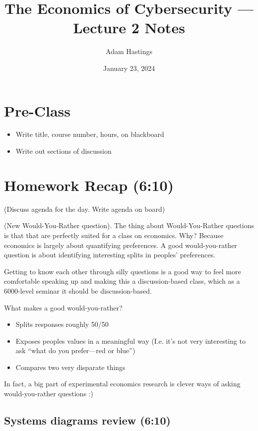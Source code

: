 \documentclass[11pt]{article}
\title{The Economics of Cybersecurity --- Lecture 2 Notes}
\date{January 23, 2024}
\author{Adam Hastings}
\begin{document}
\maketitle

\section*{Pre-Class}
\begin{itemize}
    \item Write title, course number, hours, on blackboard
    \item Write out sections of discussion
\end{itemize}

\section{Homework Recap (6:10)} 

(Discuss agenda for the day. Write agenda on board)

(New Would-You-Rather question). The thing about Would-You-Rather questions is that that are perfectly suited for a class on economics. Why? Because economics is largely about quantifying preferences. A good would-you-rather question is about identifying interesting splits in peoples' preferences. 

Getting to know each other through silly questions is a good way to feel more comfortable speaking up and making this a discussion-based class, which as a 6000-level seminar it should be discussion-based. 

What makes a good would-you-rather?

\begin{itemize}
    \item Splits responses roughly 50/50
    \item Exposes peoples values in a meaningful way (I.e. it's not very interesting to ask ``what do you prefer---red or blue'')
    \item Compares two very disparate things
\end{itemize}

In fact, a big part of experimental economics research is clever ways of asking would-you-rather questions :) 

\subsection{Systems diagrams review (6:10)}
\end{document}
